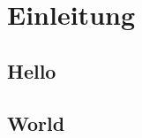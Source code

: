 \chapter{Einleitung}

    \section{Hello}
        \lipsum[1-20]
        
    \section{World}
        \lipsum[21]